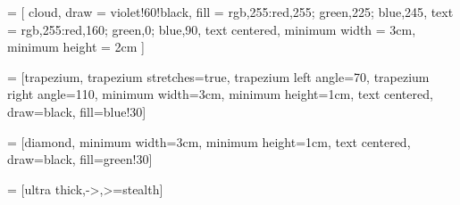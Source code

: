  = [
    cloud,
    draw = violet!60!black,
    fill = {rgb,255:red,255; green,225; blue,245}, %
    text = {rgb,255:red,160; green,0; blue,90},   %
    text centered,
    minimum width = 3cm,
    minimum height = 2cm
]

 = [trapezium, 
trapezium stretches=true, %
trapezium left angle=70, 
trapezium right angle=110, 
minimum width=3cm, 
minimum height=1cm, text centered, 
draw=black, fill=blue!30]

 = [diamond, 
minimum width=3cm, 
minimum height=1cm, 
text centered, 
draw=black, 
fill=green!30]

 = [ultra thick,->,>=stealth]
